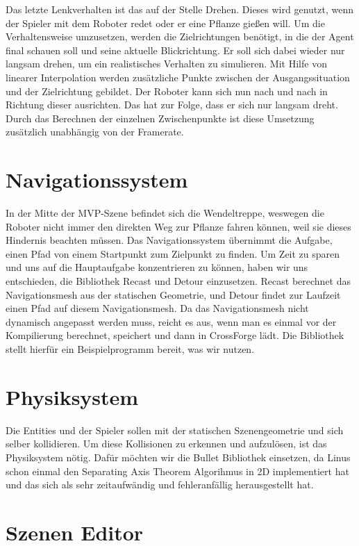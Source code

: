 Das letzte Lenkverhalten ist das auf der Stelle Drehen. Dieses wird genutzt, wenn der Spieler mit dem Roboter redet oder er eine Pflanze gießen will. Um die Verhaltensweise umzusetzen, werden die Zielrichtungen benötigt, in die der Agent final schauen soll und seine aktuelle Blickrichtung. Er soll sich dabei wieder nur langsam drehen, um ein realistisches Verhalten zu simulieren. Mit Hilfe von linearer Interpolation werden zusätzliche Punkte zwischen der Ausgangssituation und der Zielrichtung gebildet. Der Roboter kann sich nun nach und nach in Richtung dieser ausrichten. Das hat zur Folge, dass er sich nur langsam dreht. Durch das Berechnen der einzelnen Zwischenpunkte ist diese Umsetzung zusätzlich unabhängig von der Framerate.

\section{Navigationssystem}

In der Mitte der MVP-Szene befindet sich die Wendeltreppe, weswegen die Roboter nicht immer den direkten Weg zur Pflanze fahren können, weil sie dieses Hindernis beachten müssen. Das Navigationssystem übernimmt die Aufgabe, einen Pfad von einem Startpunkt zum Zielpunkt zu finden. Um Zeit zu sparen und uns auf die Hauptaufgabe konzentrieren zu können, haben wir uns entschieden, die Bibliothek Recast und Detour einzusetzen. Recast berechnet das Navigationsmesh aus der statischen Geometrie, und Detour findet zur Laufzeit einen Pfad auf diesem Navigationsmesh. Da das Navigationsmesh nicht dynamisch angepasst werden muss, reicht es aus, wenn man es einmal vor der Kompilierung berechnet, speichert und dann in CrossForge lädt. Die Bibliothek stellt hierfür ein Beispielprogramm bereit, was wir nutzen.

\section{Physiksystem}

Die Entities und der Spieler sollen mit der statischen Szenengeometrie und sich selber kollidieren. Um diese Kollisionen zu erkennen und aufzulösen, ist das Physiksystem nötig. Dafür möchten wir die Bullet Bibliothek einsetzen, da Linus schon einmal den Separating Axis Theorem Algorihmus in 2D implementiert hat und das sich als sehr zeitaufwändig und fehleranfällig herausgestellt hat. 


\section{Szenen Editor}

